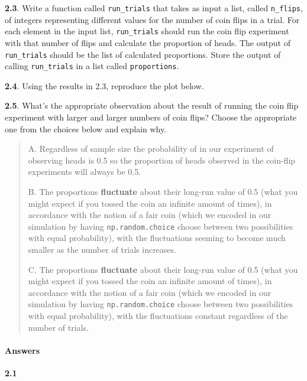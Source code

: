 \documentclass[11pt]{article}
\begin{document}
\textbf{2.3}. Write a function called \texttt{run\_trials} that takes as
input a list, called \texttt{n\_flips}, of integers representing
different values for the number of coin flips in a trial. For each
element in the input list, \texttt{run\_trials} should run the coin flip
experiment with that number of flips and calculate the proportion of
heads. The output of \texttt{run\_trials} should be the list of
calculated proportions. Store the output of calling \texttt{run\_trials}
in a list called \texttt{proportions}.

\textbf{2.4}. Using the results in 2.3, reproduce the plot below.

\textbf{2.5}. What's the appropriate observation about the result of
running the coin flip experiment with larger and larger numbers of coin
flips? Choose the appropriate one from the choices below and explain
why.

\begin{quote}
A. Regardless of sample size the probability of in our experiment of
observing heads is 0.5 so the proportion of heads observed in the
coin-flip experiments will always be 0.5.

B. The proportions \textbf{fluctuate} about their long-run value of 0.5
(what you might expect if you tossed the coin an infinite amount of
times), in accordance with the notion of a fair coin (which we encoded
in our simulation by having \texttt{np.random.choice} choose between two
possibilities with equal probability), with the fluctuations seeming to
become much smaller as the number of trials increases.

C. The proportions \textbf{fluctuate} about their long-run value of 0.5
(what you might expect if you tossed the coin an infinite amount of
times), in accordance with the notion of a fair coin (which we encoded
in our simulation by having \texttt{np.random.choice} choose between two
possibilities with equal probability), with the fluctuations constant
regardless of the number of trials.
\end{quote}

    \paragraph{Answers}\label{answers}

    \textbf{2.1}
\end{document}
